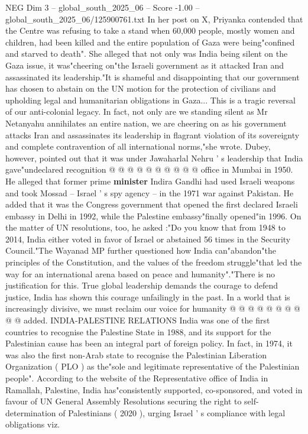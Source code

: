 \begin{textsample}{NEG Dim 3 – global\_south\_2025\_06 – Score -1.00 – global\_south\_2025\_06/125900761.txt}  \label{ex:f3_neg_268}
In her post on X, Priyanka contended that the Centre was refusing to take a stand when 60,000 people, mostly women and children, had been killed and the entire population of Gaza were being"confined and starved to death".
She alleged that not only was India being silent on the Gaza issue, it was"cheering on"the Israeli government as it attacked Iran and assassinated its leadership."It is shameful and disappointing that our government has chosen to abstain on the UN motion for the protection of civilians and upholding legal and humanitarian obligations in Gaza...
This is a tragic reversal of our anti-colonial legacy.
In fact, not only are we standing silent as Mr Netanyahu annihilates an entire nation, we are cheering on as his government attacks Iran and assassinates its leadership in flagrant violation of its sovereignty and complete contravention of all international norms,"she wrote.
Dubey, however, pointed out that it was under Jawaharlal Nehru ' s leadership that India gave"undeclared recognition @ @ @ @ @ @ @ @ @ @ office in Mumbai in 1950.
He alleged that former prime \textbf{minister} Indira Gandhi had used Israeli weapons and took Mossad -- Israel ' s spy agency -- in the 1971 war against Pakistan.
He added that it was the Congress government that opened the first declared Israeli embassy in Delhi in 1992, while the Palestine embassy"finally opened"in 1996.
On the matter of UN resolutions, too, he asked :"Do you know that from 1948 to 2014, India either voted in favor of Israel or abstained 56 times in the Security Council."The Wayanad MP further questioned how India can"abandon"the principles of the Constitution, and the values of the freedom struggle"that led the way for an international arena based on peace and humanity"."There is no justification for this.
True global leadership demands the courage to defend justice, India has shown this courage unfailingly in the past.
In a world that is increasingly divisive, we must reclaim our voice for humanity @ @ @ @ @ @ @ @ @ @ added.
INDIA-PALESTINE RELATIONS India was one of the first countries to recognise the Palestine State in 1988, and its support for the Palestinian cause has been an integral part of foreign policy.
In fact, in 1974, it was also the first non-Arab state to recognise the Palestinian Liberation Organization ( PLO ) as the"sole and legitimate representative of the Palestinian people".
According to the website of the Representative office of India in Ramallah, Palestine, India has"consistently supported, co-sponsored, and voted in favour of UN General Assembly Resolutions securing the right to self-determination of Palestinians ( 2020 ), urging Israel ' s compliance with legal obligations viz.

\end{textsample}

